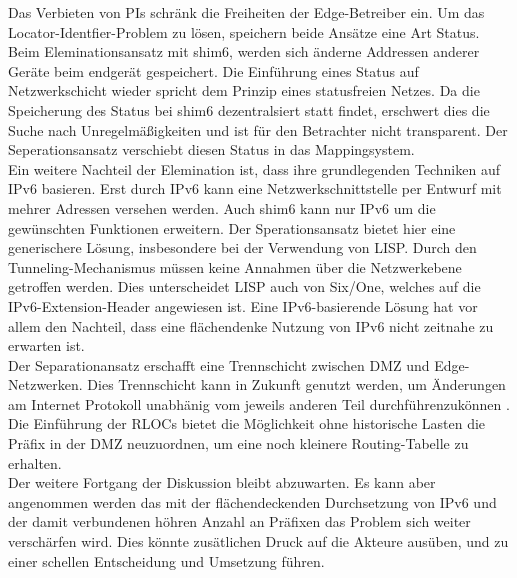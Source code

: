 Das Verbieten von PIs schränk die Freiheiten der Edge-Betreiber ein. %
Um das Locator-Identfier-Problem zu lösen, speichern beide Ansätze eine Art Status. Beim Eleminationsansatz mit shim6, werden sich änderne Addressen anderer Geräte beim endgerät gespeichert. Die Einführung eines Status auf Netzwerkschicht wieder spricht dem Prinzip eines statusfreien Netzes. Da die Speicherung des Status bei shim6 dezentralsiert statt findet, erschwert dies die Suche nach Unregelmäßigkeiten und ist für den Betrachter nicht transparent. Der Seperationsansatz verschiebt diesen Status in das Mappingsystem. \\
Ein weitere Nachteil der Elemination ist, dass ihre grundlegenden Techniken auf IPv6 basieren. Erst durch IPv6 kann eine Netzwerkschnittstelle per Entwurf mit mehrer Adressen versehen werden. Auch shim6 kann nur IPv6 um die gewünschten Funktionen erweitern. Der Sperationsansatz bietet hier eine generischere Lösung, insbesondere bei der Verwendung von LISP. Durch den Tunneling-Mechanismus müssen keine Annahmen über die Netzwerkebene getroffen werden. Dies unterscheidet LISP auch von Six/One, welches auf die IPv6-Extension-Header angewiesen ist. Eine IPv6-basierende Lösung hat vor allem den Nachteil, dass eine flächendenke Nutzung von IPv6 nicht zeitnahe zu erwarten ist. \\
Der Separationansatz erschafft eine Trennschicht zwischen DMZ und Edge-Netzwerken. Dies Trennschicht kann in Zukunft genutzt werden, um Änderungen am Internet Protokoll unabhänig vom jeweils anderen Teil durchführenzukönnen \cite{jen:2008:start}. \\
Die Einführung der RLOCs bietet die Möglichkeit ohne historische Lasten die Präfix in der DMZ neuzuordnen, um eine noch kleinere Routing-Tabelle zu erhalten. \\

Der weitere Fortgang der Diskussion bleibt abzuwarten. Es kann aber angenommen werden das mit der flächendeckenden Durchsetzung von IPv6 und der damit verbundenen höhren Anzahl an Präfixen das Problem sich weiter verschärfen wird. Dies könnte zusätlichen Druck auf die Akteure ausüben, und zu einer schellen Entscheidung und Umsetzung führen.



